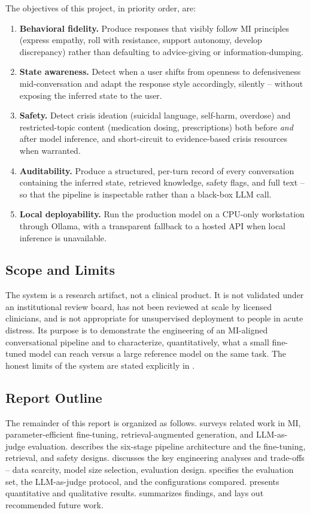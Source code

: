The objectives of this project, in priority order, are:
\begin{enumerate}
    \item \textbf{Behavioral fidelity.} Produce responses that visibly follow
    MI principles (express empathy, roll with resistance, support autonomy,
    develop discrepancy) rather than defaulting to advice-giving or
    information-dumping.
    \item \textbf{State awareness.} Detect when a user shifts from openness
    to defensiveness mid-conversation and adapt the response style accordingly,
    silently -- without exposing the inferred state to the user.
    \item \textbf{Safety.} Detect crisis ideation (suicidal language,
    self-harm, overdose) and restricted-topic content (medication dosing,
    prescriptions) both before \emph{and} after model inference, and
    short-circuit to evidence-based crisis resources when warranted.
    \item \textbf{Auditability.} Produce a structured, per-turn record of every
    conversation containing the inferred state, retrieved knowledge, safety
    flags, and full text -- so that the pipeline is inspectable rather than a
    black-box LLM call.
    \item \textbf{Local deployability.} Run the production model on a CPU-only
    workstation through Ollama, with a transparent fallback to a hosted API
    when local inference is unavailable.
\end{enumerate}

\subsection{Scope and Limits}

The system is a research artifact, not a clinical product. It is not validated
under an institutional review board, has not been reviewed at scale by licensed
clinicians, and is not appropriate for unsupervised deployment to people in
acute distress. Its purpose is to demonstrate the engineering of an
MI-aligned conversational pipeline and to characterize, quantitatively, what a
small fine-tuned model can reach versus a large reference model on the same
task. The honest limits of the system are stated explicitly in
.

\subsection{Report Outline}

The remainder of this report is organized as follows.
 surveys related work in MI, parameter-efficient
fine-tuning, retrieval-augmented generation, and LLM-as-judge evaluation.
 describes the six-stage pipeline architecture and the
fine-tuning, retrieval, and safety designs.
 discusses the key engineering analyses and trade-offs --
data scarcity, model size selection, evaluation design.
 specifies the evaluation set, the LLM-as-judge protocol,
and the configurations compared.
 presents quantitative and qualitative results.
 summarizes findings, and  lays out
recommended future work.
